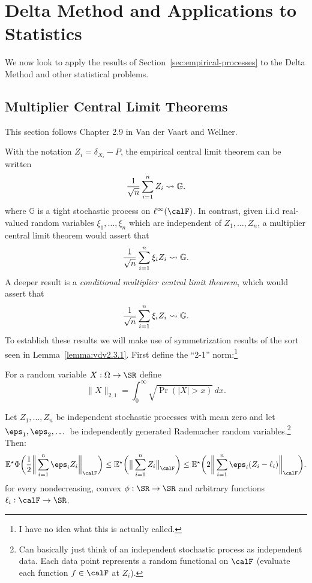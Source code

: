 \section{Delta Method and Applications to Statistics}
\label{sec:delta-applications}

We now look to apply the results of Section~\ref{sec:empirical-processes} to the Delta Method and other statistical problems. 

\subsection{Multiplier Central Limit Theorems}%
\label{subsec:mclt}

This section follows Chapter 2.9 in Van der Vaart and Wellner. 

With the notation \(Z_i = \delta_{X_i}-P\), the empirical central limit theorem can be written
\[
    \frac{1}{\sqrt{n}} \sum_{i=1}^n Z_i \rightsquigarrow \mathbb{G}
.\] 
where \(\mathbb{G}\) is a tight stochastic process on \(\ell^\infty(\calF)\). In contrast, given i.i.d real-valued random variables \(\xi_1,\dots,\xi_n\) which are independent of \(Z_1,\dots,Z_n\), a multiplier central limit theorem would assert that 
\[
    \frac{1}{\sqrt{n}}\sum_{i=1}^n \xi_iZ_i\rightsquigarrow \mathbb{G}
.\]
A deeper result is a \emph{conditional multiplier central limit theorem}, which would assert that 
\[
    \frac{1}{\sqrt{n}}\sum_{i=1}^n \xi_iZ_i\rightsquigarrow \mathbb{G}
.\] 
To establish these results we will make use of symmetrization results of the sort seen in Lemma~\ref{lemma:vdv2.3.1}. First define the ``2-1'' norm:\footnote{I have no idea what this is actually called.}
\begin{definition}[2-1 Norm]
	\label{def:21norm}
	For a random variable \(X:\Omega\to\SR\) define
	\[
		\|X\|_{2,1}=\int_{0}^{\infty} \sqrt{\Pr\left(|X|>x\right)}\,dx 
	.\] 
\end{definition}
\begin{lemma}
	\label{lemma:generalized-symmetrization}
	Let \(Z_1,\dots,Z_n\) be independent stochastic processes with mean zero and let \(\eps_1,\eps_2,\dots\) be independently generated Rademacher random variables.\footnote{Can basically just think of an independent stochastic process as independent data. Each data point represents a random functional on \(\calF\) (evaluate each function \(f\in\calF\) at \(Z_i\)).} Then:
	\[
	    \E^\star\Phi\bigg(\frac{1}{2}\bigg\|\sum_{i=1}^n \eps_iZ_i\bigg\|_\calF\bigg)
		\leq \E^\star\bigg(\big\|\sum_{i=1}^n Z_i\big\|_\calF\bigg)
		\leq \E^\star\bigg(2\bigg\|\sum_{i=1}^n \eps_i(Z_i-\ell_i)\bigg\|_\calF\bigg)
	.\]
	for every nondecreasing, convex \(\phi:\SR\to\SR\) and arbitrary functions \(\ell_i:\calF\to\SR\).
\end{lemma}
